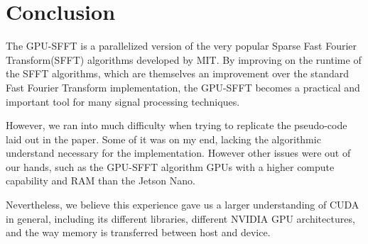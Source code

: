 \section{Conclusion}

The GPU-SFFT is a parallelized version of the very popular Sparse Fast Fourier Transform(SFFT) algorithms developed by MIT. By improving on the runtime of the SFFT algorithms, which are themselves an improvement over the standard Fast Fourier Transform implementation, the GPU-SFFT becomes a practical and important tool for many signal processing techniques.
    
However, we ran into much difficulty when trying to replicate the pseudo-code laid out in the paper. Some of it was on my end, lacking the algorithmic understand necessary for the implementation. However other issues were out of our hands, such as the GPU-SFFT algorithm GPUs with a higher compute capability and RAM than the Jetson Nano.

Nevertheless, we believe this experience gave us a larger understanding of CUDA in general, including its different libraries, different NVIDIA GPU architectures, and the way memory is transferred between host and device.
